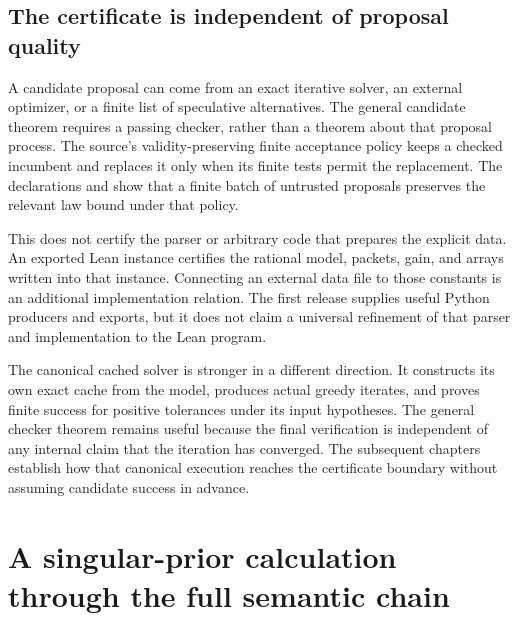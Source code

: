 \subsection{The certificate is independent of proposal quality}

A candidate proposal can come from an exact iterative solver, an external optimizer, or a finite list of speculative alternatives. The general candidate theorem requires a passing checker, rather than a theorem about that proposal process. The source's validity-preserving finite acceptance policy keeps a checked incumbent and replaces it only when its finite tests permit the replacement. The declarations  and  show that a finite batch of untrusted proposals preserves the relevant law bound under that policy.

This does not certify the parser or arbitrary code that prepares the explicit data. An exported Lean instance certifies the rational model, packets, gain, and arrays written into that instance. Connecting an external data file to those constants is an additional implementation relation. The first release supplies useful Python producers and exports, but it does not claim a universal refinement of that parser and implementation to the Lean program.

The canonical cached solver is stronger in a different direction. It constructs its own exact cache from the model, produces actual greedy iterates, and proves finite success for positive tolerances under its input hypotheses. The general checker theorem remains useful because the final verification is independent of any internal claim that the iteration has converged. The subsequent chapters establish how that canonical execution reaches the certificate boundary without assuming candidate success in advance.

\section{A singular-prior calculation through the full semantic chain}
\label{sec:foundation-singular-example}

